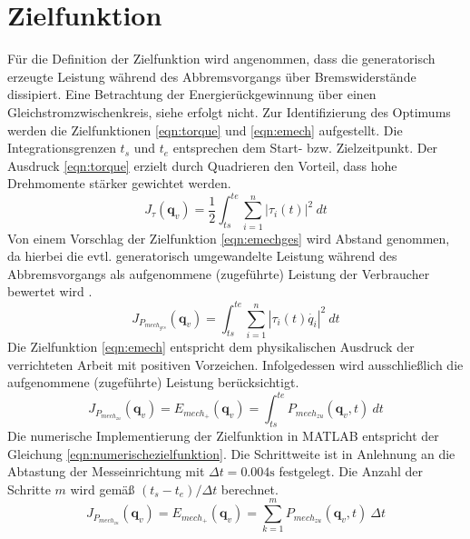 \section{Zielfunktion}
Für die Definition der Zielfunktion wird angenommen, dass die generatorisch erzeugte Leistung während des Abbremsvorgangs über Bremswiderstände dissipiert. \cite[S.~19]{Eggers.2019} Eine Betrachtung der Energierückgewinnung über einen Gleichstromzwischenkreis, siehe \cite[S.~29]{Ziaukas.2017} erfolgt nicht. Zur Identifizierung des Optimums werden die Zielfunktionen \ref{eqn:torque} \cite[S-~1]{Hansen.2012} und \ref{eqn:emech} \cite[S.~57]{Eggers.2019} aufgestellt. Die Integrationsgrenzen $t_s$ und $t_e$ entsprechen dem Start- bzw. Zielzeitpunkt. Der Ausdruck \ref{eqn:torque} erzielt durch Quadrieren den Vorteil, dass hohe Drehmomente stärker gewichtet werden.\textbf{}
%
\begin{equation}
	\label{eqn:torque}
	J_{\tau}(\bm{q}_{v}) = \frac{1}{2}\int_{ts}^{te}\sum_{i=1}^{n}\left|\tau_i(t)\right|^2~dt
\end{equation}
%
Von einem Vorschlag der Zielfunktion \ref{eqn:emechges} \cite[S.~1216]{Saravanan.2008} wird Abstand genommen, da hierbei die evtl. generatorisch umgewandelte Leistung während des Abbremsvorgangs als aufgenommene (zugeführte) Leistung der Verbraucher bewertet wird \cite[S.~19]{Hansen.2012}. 
%
\begin{equation}
	\label{eqn:emechges}
	J_{P_{mech_{ges}}}(\bm{q}_{v}) = \int_{ts}^{te}\sum_{i=1}^{n}\left|\tau_i(t)\dot{q_i}\right|^2~dt
\end{equation}
%
Die Zielfunktion \ref{eqn:emech} entspricht dem physikalischen Ausdruck der verrichteten Arbeit mit positiven Vorzeichen. Infolgedessen wird ausschließlich die aufgenommene (zugeführte) Leistung berücksichtigt. 
%
\begin{equation}
	\label{eqn:emech}
	J_{P_{mech_{zu}}}
	(\bm{q}_{v}) 
	= E_{mech_{+}}(\bm{q}_{v}) 
	=\int_{ts}^{te}P_{mech_{zu}}(\bm{q}_{v},t)~dt
\end{equation}
%
Die numerische Implementierung der Zielfunktion in  MATLAB\textsuperscript{\textregistered} entspricht der Gleichung  \ref{eqn:numerischezielfunktion}. Die Schrittweite ist in Anlehnung an die Abtastung der Messeinrichtung  mit $\Delta t = 0.004 \text{s}$ festgelegt. Die Anzahl der Schritte $m$  wird gemäß $(t_s-t_e)/\Delta t$ berechnet.
%
\begin{equation}
	\label{eqn:numerischezielfunktion}
	J_{P_{mech_{zu}}}
	(\bm{q}_{v}) 
	= E_{mech_{+}}(\bm{q}_{v}) 
	= \sum_{k=1}^{m} P_{mech_{zu}}(\bm{q}_{v},t)~\Delta t
\end{equation}
%

